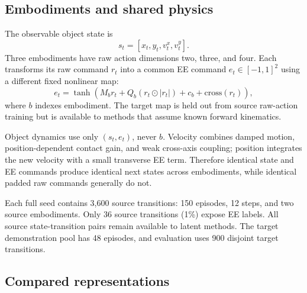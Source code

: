 \documentclass[11pt]{article}
\begin{document}
\subsection{Embodiments and shared physics}

The observable object state is
\begin{equation}
  s_t=[x_t,y_t,v^x_t,v^y_t].
\end{equation}
Three embodiments have raw action dimensions two, three, and four. Each transforms its raw command $r_t$ into a common EE command $e_t\in[-1,1]^2$ using a different fixed nonlinear map:
\begin{equation}
  e_t=\tanh(M_b r_t+Q_b(r_t\odot |r_t|)+c_b+\text{cross}(r_t)),
\end{equation}
where $b$ indexes embodiment. The target map is held out from source raw-action training but is available to methods that assume known forward kinematics.

Object dynamics use only $(s_t,e_t)$, never $b$. Velocity combines damped motion, position-dependent contact gain, and weak cross-axis coupling; position integrates the new velocity with a small transverse EE term. Therefore identical state and EE commands produce identical next states across embodiments, while identical padded raw commands generally do not.

Each full seed contains 3,600 source transitions: 150 episodes, 12 steps, and two source embodiments. Only 36 source transitions (1\%) expose EE labels. All source state-transition pairs remain available to latent methods. The target demonstration pool has 48 episodes, and evaluation uses 900 disjoint target transitions.

\subsection{Compared representations}
\end{document}
